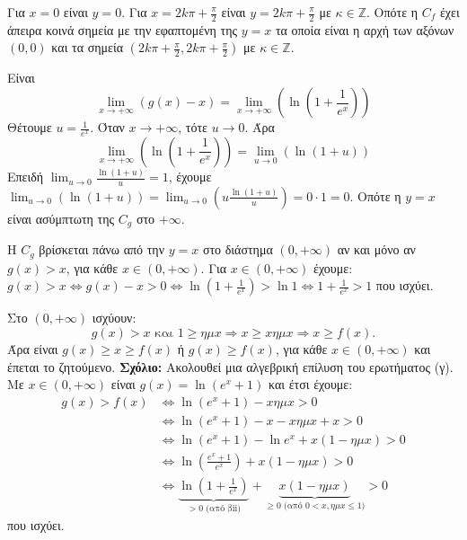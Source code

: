 \begin{alist}
\begin{rlist}
    Για $x=0$ είναι $y=0$.
    Για $x=2k\pi+\frac{\pi}{2}$ είναι $y=2k\pi+\frac{\pi}{2}$ με $\kappa \in \mathbb{Z}$.
    Οπότε η $C_f$ έχει άπειρα κοινά σημεία με την εφαπτομένη της $y=x$ τα οποία είναι η αρχή των αξόνων $(0,0)$ και τα σημεία $\left(2k\pi+\frac{\pi}{2}, 2k\pi+\frac{\pi}{2}\right)$ με $\kappa \in \mathbb{Z}$.
    \end{rlist}
\item %
    \begin{rlist}
    \item %
    Είναι
    \[ \lim_{x \to +\infty} (g(x)-x) = \lim_{x \to +\infty} \left(\ln\left(1+\frac{1}{e^x}\right)\right) \]
    Θέτουμε $u=\frac{1}{e^x}$. Όταν $x \to +\infty$, τότε $u \to 0$. Άρα
    \[ \lim_{x \to +\infty} \left(\ln\left(1+\frac{1}{e^x}\right)\right) = \lim_{u \to 0} (\ln(1+u)) \]
    Επειδή $\lim_{u \to 0} \frac{\ln(1+u)}{u} = 1$, έχουμε $\lim_{u \to 0} (\ln(1+u)) = \lim_{u \to 0} \left(u \frac{\ln(1+u)}{u}\right) = 0 \cdot 1 = 0$.
    Οπότε η $y=x$ είναι ασύμπτωτη της $C_g$ στο $+\infty$.
    \item %
    Η $C_g$ βρίσκεται πάνω από την $y=x$ στο διάστημα $(0,+\infty)$ αν και μόνο αν $g(x) > x$, για κάθε $x \in (0,+\infty)$.
    Για $x \in (0,+\infty)$ έχουμε: $g(x) > x \Leftrightarrow g(x) - x > 0 \Leftrightarrow \ln\left(1+\frac{1}{e^x}\right) > \ln 1 \Leftrightarrow 1+\frac{1}{e^x} > 1$ που ισχύει.
    \end{rlist}
\item %
    Στο $(0,+\infty)$ ισχύουν:
    \[ g(x)>x \text{ και } 1 \ge \eta\mu x \Rightarrow x \ge x\eta\mu x \Rightarrow x \ge f(x). \]
    Άρα είναι $g(x) \ge x \ge f(x)$ ή $g(x) \ge f(x)$, για κάθε $x \in (0,+\infty)$ και έπεται το ζητούμενο.
    \textbf{Σχόλιο:} Ακολουθεί μια αλγεβρική επίλυση του ερωτήματος (γ).
    Με $x \in (0,+\infty)$ είναι $g(x)=\ln(e^x+1)$ και έτσι έχουμε:
    \begin{align*}
        g(x) > f(x) & \Leftrightarrow \ln(e^x+1) - x\eta\mu x > 0 \\
        & \Leftrightarrow \ln(e^x+1) - x - x\eta\mu x + x > 0 \\
        & \Leftrightarrow \ln(e^x+1) - \ln e^x + x(1-\eta\mu x) > 0 \\
        & \Leftrightarrow \ln\left(\frac{e^x+1}{e^x}\right) + x(1-\eta\mu x) > 0 \\
        & \Leftrightarrow \underbrace{\ln\left(1+\frac{1}{e^x}\right)}_{>0 \text{ (από βii)}} + \underbrace{x(1-\eta\mu x)}_{\ge 0 \text{ (από } 0<x, \eta\mu x \le 1 \text{)}} > 0
    \end{align*}
    που ισχύει.
\end{alist}